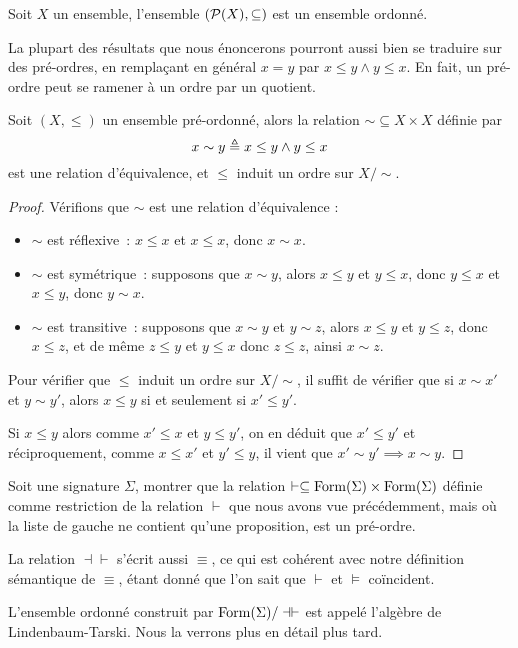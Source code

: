 \begin{example}
  Soit $X$ un ensemble, l'ensemble $(\mathcal{P}(X),\subseteq)$ est un ensemble
  ordonné.
\end{example}

La plupart des résultats que nous énoncerons pourront aussi bien se traduire sur
des pré-ordres, en remplaçant en général $x = y$ par $x\leq y \land y \leq x$.
En fait, un pré-ordre peut se ramener à un ordre par un quotient.

\begin{property}
  Soit $(X,\leq)$ un ensemble pré-ordonné, alors la relation
  $\sim\subseteq X \times X$ définie par
  \[x\sim y \triangleq x\leq y \land y \leq x\]
  est une relation d'équivalence, et $\leq$ induit un ordre sur $X/\sim$.
\end{property}

\begin{proof}
  Vérifions que $\sim$ est une relation d'équivalence :
  \begin{itemize}
  \item $\sim$ est réflexive~: $x\leq x$ et $x\leq x$, donc $x\sim x$.
  \item $\sim$ est symétrique~: supposons que $x\sim y$, alors $x\leq y$ et
    $y\leq x$, donc $y\leq x$ et $x\leq y$, donc $y\sim x$.
  \item $\sim$ est transitive~: supposons que $x\sim y$ et $y\sim z$, alors
    $x\leq y$ et $y\leq z$, donc $x\leq z$, et de même $z\leq y$ et $y\leq x$
    donc $z\leq z$, ainsi $x\sim z$.
  \end{itemize}

  Pour vérifier que $\leq$ induit un ordre sur $X/\sim$, il suffit de vérifier
  que si $x\sim x'$ et $y\sim y'$, alors $x\leq y$ si et seulement si
  $x'\leq y'$.

  Si $x\leq y$ alors comme $x'\leq x$ et $y\leq y'$, on en déduit que
  $x'\leq y'$
  et réciproquement, comme $x\leq x'$ et $y'\leq y$, il vient que
  $x'\sim y'\implies x\sim y$.
\end{proof}

\begin{exercise}
  Soit une signature $\Sigma$, montrer que la relation
  $\vdash\subseteq\operatorname{Form}(\Sigma)\times\operatorname{Form}(\Sigma)$ définie comme
  restriction de la relation $\vdash$ que nous avons vue précédemment, mais où
  la liste de gauche ne contient qu'une proposition, est un pré-ordre.
\end{exercise}

\begin{remark}
  La relation $\dashv\vdash$ s'écrit aussi $\equiv$, ce qui est cohérent avec
  notre définition sémantique de $\equiv$, étant donné que l'on sait que
  $\vdash$ et $\vDash$ coïncident.

  L'ensemble ordonné construit par $\operatorname{Form}(\Sigma)/\dashv\vdash$ est appelé
  l'algèbre de Lindenbaum-Tarski. Nous la verrons plus en détail plus tard.
\end{remark}

